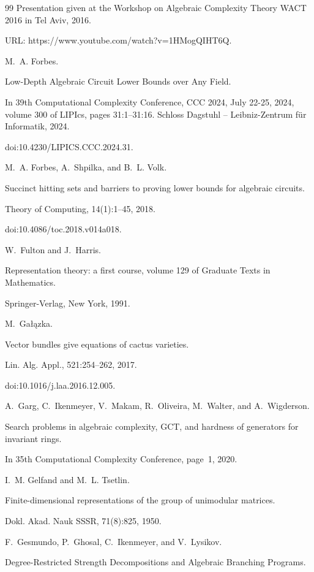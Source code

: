 \documentclass[10pt,a4paper]{article}
\begin{document}
\begin{thebibliography}{99}
Presentation given at the Workshop on Algebraic Complexity Theory
WACT 2016 in Tel Aviv, 2016.


URL: https://www.youtube.com/watch?v=1HMogQIHT6Q.

M. A. Forbes.


Low-Depth Algebraic Circuit Lower Bounds over Any Field.


In 39th Computational Complexity Conference, CCC 2024, July
22-25, 2024, volume 300 of LIPIcs, pages 31:1–31:16. Schloss
Dagstuhl – Leibniz-Zentrum für Informatik, 2024.


doi:10.4230/LIPICS.CCC.2024.31.

M. A. Forbes, A. Shpilka, and B. L. Volk.


Succinct hitting sets and barriers to proving lower bounds for
algebraic circuits.


Theory of Computing, 14(1):1–45, 2018.


doi:10.4086/toc.2018.v014a018.

W. Fulton and J. Harris.


Representation theory: a first course, volume 129 of Graduate Texts in Mathematics.


Springer-Verlag, New York, 1991.

M. Gałązka.


Vector bundles give equations of cactus varieties.


Lin. Alg. Appl., 521:254–262, 2017.


doi:10.1016/j.laa.2016.12.005.

A. Garg, C. Ikenmeyer, V. Makam, R. Oliveira, M. Walter, and A. Wigderson.


Search problems in algebraic complexity, GCT, and hardness of
generators for invariant rings.


In 35th Computational Complexity Conference, page 1, 2020.

I. M. Gelfand and M. L. Tsetlin.


Finite-dimensional representations of the group of unimodular
matrices.


Dokl. Akad. Nauk SSSR, 71(8):825, 1950.

F. Gesmundo, P. Ghosal, C. Ikenmeyer, and V. Lysikov.


Degree-Restricted Strength Decompositions and Algebraic Branching
Programs.



\end{thebibliography}
\end{document}
